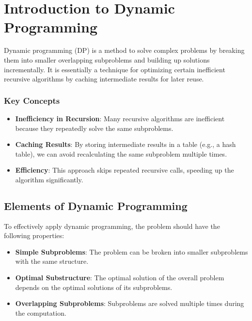 \chapter{Introduction to Dynamic Programming}

Dynamic programming (DP) is a method to solve complex problems by breaking them into smaller overlapping subproblems and building up solutions incrementally. It is essentially a technique for optimizing certain inefficient recursive algorithms by caching intermediate results for later reuse. 

\subsection{Key Concepts}
\begin{itemize}
    \item \textbf{Inefficiency in Recursion}: Many recursive algorithms are inefficient because they repeatedly solve the same subproblems.
    \item \textbf{Caching Results}: By storing intermediate results in a table (e.g., a hash table), we can avoid recalculating the same subproblem multiple times.
    \item \textbf{Efficiency}: This approach skips repeated recursive calls, speeding up the algorithm significantly.
\end{itemize}

\section{Elements of Dynamic Programming}

To effectively apply dynamic programming, the problem should have the following properties:

\begin{itemize}
    \item \textbf{Simple Subproblems}: The problem can be broken into smaller subproblems with the same structure.
    \item \textbf{Optimal Substructure}: The optimal solution of the overall problem depends on the optimal solutions of its subproblems.
    \item \textbf{Overlapping Subproblems}: Subproblems are solved multiple times during the computation.
\end{itemize}

